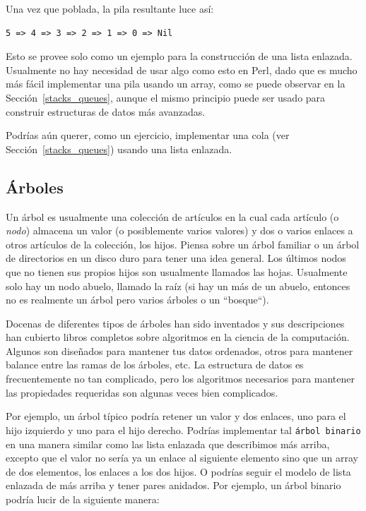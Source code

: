 Una vez que poblada, la pila resultante luce así:

\begin{verbatim}
5 => 4 => 3 => 2 => 1 => 0 => Nil
\end{verbatim}

Esto se provee solo como un ejemplo para la construcción de una
lista enlazada. Usualmente no hay necesidad de usar algo como
esto en Perl, dado que es mucho más fácil implementar una pila
usando un array, como se puede observar en la Sección~\ref{stacks_queues}, 
aunque el mismo principio puede ser usado para construir 
estructuras de datos más avanzadas.

Podrías aún querer, como un ejercicio, implementar una cola 
(ver Sección~\ref{stacks_queues}) usando una lista enlazada. 

\subsection{Árboles}
\label{tree}

Un árbol es usualmente una colección de artículos en la
cual cada artículo (o \emph{nodo}) almacena un valor (o
posiblemente varios valores) y dos o varios enlaces 
a otros artículos de la colección, los hijos. Piensa
sobre un árbol familiar o un árbol de directorios en un
disco duro para tener una idea general. Los últimos
nodos que no tienen sus propios hijos son usualmente llamados
las hojas. Usualmente solo hay un nodo abuelo, llamado
la raíz (si hay un más de un abuelo, entonces no es realmente
un árbol pero varios árboles o un ``bosque``).

Docenas de diferentes tipos de árboles han sido inventados
y sus descripciones han cubierto libros completos sobre algoritmos
en la ciencia de la computación. Algunos son diseñados para mantener
tus datos ordenados, otros para mantener balance entre las ramas
de los árboles, etc. La estructura de datos es frecuentemente 
no tan complicado, pero los algoritmos necesarios para mantener
las propiedades requeridas son algunas veces bien complicados.

Por ejemplo, un árbol típico podría retener un valor y dos enlaces,
uno para el hijo izquierdo y uno para el hijo derecho. Podrías 
implementar tal {\tt árbol binario} en una manera similar como las
lista enlazada que describimos más arriba, excepto que el valor
no sería ya un enlace al siguiente elemento sino que un
array de dos elementos, los enlaces a los dos hijos. O podrías
seguir el modelo de lista enlazada de más arriba y tener pares
anidados. Por ejemplo, un árbol binario podría lucir de la 
siguiente manera:

